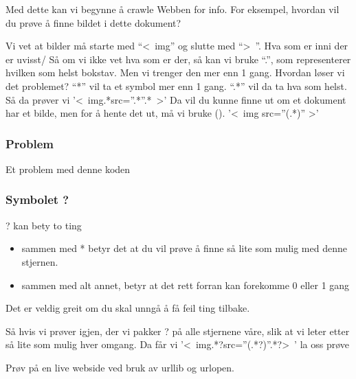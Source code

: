 \documentclass[onesided,norsk,11pt]{beamer}
\begin{document}
\begin{frame}
  Med dette kan vi begynne å crawle Webben for info.
  For eksempel, hvordan vil du prøve å finne bildet i
  dette dokument?
  
\end{frame}

\begin{frame}
  Vi vet at bilder må starte med ``\textless~img'' og slutte med
  ``\textgreater~''. Hva som er inni der er uvisst/
  Så om vi ikke vet hva som er der, så kan vi bruke ``.'', som
  representerer hvilken som helst bokstav. Men vi trenger den
  mer enn 1 gang. Hvordan løser vi det problemet?
  ``*'' vil ta et symbol mer enn 1 gang. ``.*'' vil da ta hva 
  som helst.
  Så da prøver vi '\textless~img.*src=''.*''.*~\textgreater'
  Da vil du kunne finne ut om et dokument har et bilde, men for å
  hente det ut, må vi bruke ().
  '\textless~img src=''(.*)'' \textgreater'
\end{frame}

\begin{frame}
  \frametitle{Problem}
  Et problem med denne koden
  
\end{frame}

\begin{frame}
  \frametitle{Symbolet ?}
  
  ? kan bety to ting
  \begin{itemize}
    \item sammen med * betyr det at du vil prøve å finne 
      så lite som mulig med denne stjernen.
    \item sammen med alt annet, betyr at det rett forran
      kan forekomme 0 eller 1 gang
    \end{itemize}

    Det er veldig greit om du skal unngå å få feil ting tilbake.
\end{frame}

\begin{frame}
Så hvis vi prøver igjen, der vi pakker ? på alle stjernene våre, 
slik at vi leter etter så lite som mulig hver omgang.
Da får vi '\textless~img.*?src=''(.*?)''.*?\textgreater~'
la oss prøve
\end{frame}

\begin{frame}
Prøv på en live webside ved bruk av urllib 
og urlopen.
\end{frame}
\end{document}
